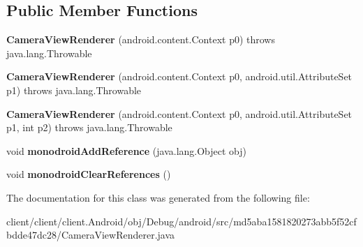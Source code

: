 \subsection*{Public Member Functions}
\begin{DoxyCompactItemize}
\item 
\hypertarget{classmd5aba1581820273abb5f52cfbdde47dc28_1_1CameraViewRenderer_a9e145084c4e3c87f008308e15bbe764b}{}{\bfseries Camera\+View\+Renderer} (android.\+content.\+Context p0)  throws java.\+lang.\+Throwable 	\label{classmd5aba1581820273abb5f52cfbdde47dc28_1_1CameraViewRenderer_a9e145084c4e3c87f008308e15bbe764b}

\item 
\hypertarget{classmd5aba1581820273abb5f52cfbdde47dc28_1_1CameraViewRenderer_a6a4ef08de57b15f364ece8158e5dd395}{}{\bfseries Camera\+View\+Renderer} (android.\+content.\+Context p0, android.\+util.\+Attribute\+Set p1)  throws java.\+lang.\+Throwable 	\label{classmd5aba1581820273abb5f52cfbdde47dc28_1_1CameraViewRenderer_a6a4ef08de57b15f364ece8158e5dd395}

\item 
\hypertarget{classmd5aba1581820273abb5f52cfbdde47dc28_1_1CameraViewRenderer_aa127c3381b2c96657c40302689ab6a3c}{}{\bfseries Camera\+View\+Renderer} (android.\+content.\+Context p0, android.\+util.\+Attribute\+Set p1, int p2)  throws java.\+lang.\+Throwable 	\label{classmd5aba1581820273abb5f52cfbdde47dc28_1_1CameraViewRenderer_aa127c3381b2c96657c40302689ab6a3c}

\item 
\hypertarget{classmd5aba1581820273abb5f52cfbdde47dc28_1_1CameraViewRenderer_a82bc3e7480698ff440c2b6eed5e41911}{}void {\bfseries monodroid\+Add\+Reference} (java.\+lang.\+Object obj)\label{classmd5aba1581820273abb5f52cfbdde47dc28_1_1CameraViewRenderer_a82bc3e7480698ff440c2b6eed5e41911}

\item 
\hypertarget{classmd5aba1581820273abb5f52cfbdde47dc28_1_1CameraViewRenderer_aad8ff3c66a3757360f0ac61d0ddef69b}{}void {\bfseries monodroid\+Clear\+References} ()\label{classmd5aba1581820273abb5f52cfbdde47dc28_1_1CameraViewRenderer_aad8ff3c66a3757360f0ac61d0ddef69b}

\end{DoxyCompactItemize}


The documentation for this class was generated from the following file\+:\begin{DoxyCompactItemize}
\item 
client/client/client.\+Android/obj/\+Debug/android/src/md5aba1581820273abb5f52cfbdde47dc28/Camera\+View\+Renderer.\+java\end{DoxyCompactItemize}
